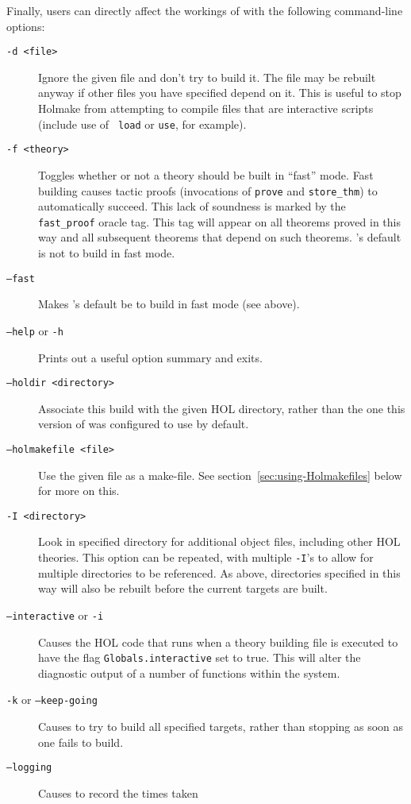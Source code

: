 \noindent Finally, users can directly affect the workings of \holmake{}
with the following command-line options:
\begin{description}
\item[\tt -d <file>] Ignore the given file and don't try to build it.
  The file may be rebuilt anyway if other files you have specified
  depend on it.  This is useful to stop Holmake from attempting to
  compile files that are interactive scripts (include use of {\tt
  load} or {\tt use}, for example).
\item[\texttt{-f <theory>}] Toggles whether or not a theory should be
  built in ``fast'' mode.  Fast building causes tactic proofs
  (invocations of \texttt{prove} and \texttt{store\_thm}) to
  automatically succeed.  This lack of soundness is marked by the
  \texttt{fast\_proof} oracle tag.  This tag will appear on all
  theorems proved in this way and all subsequent theorems that depend
  on such theorems.  \holmake's default is not to build in fast mode.
\item[\texttt{--fast}] Makes \holmake's default be to build in fast
  mode (see above).
\item[{\tt --help} or {\tt -h}] Prints out a useful option summary and
  exits.
\item[\tt --holdir <directory>] Associate this build with the given
  HOL directory, rather than the one this version of \holmake{} was
  configured to use by default.
\item[\tt --holmakefile <file>] Use the given file as a make-file.
  See section~\ref{sec:using-Holmakefiles} below for more on this.
\item[\tt -I <directory>]
  Look in specified directory for additional object files, including other HOL theories.
  This option can be repeated, with multiple {\tt -I}'s to allow for multiple directories to be referenced.
  As above, directories specified in this way will also be rebuilt before the current targets are built.
\item[\texttt{--interactive} or \texttt{-i}] Causes the HOL code that
  runs when a theory building file is executed to have the flag
  \texttt{Globals.interactive} set to true.  This will alter the diagnostic
  output of a number of functions within the system.
\item[\texttt{-k} or \texttt{--keep-going}] Causes \holmake{} to try
  to build all specified targets, rather than stopping as soon as one
  fails to build.
\item[\texttt{--logging}] Causes \holmake{} to record the times taken

\end{description}
